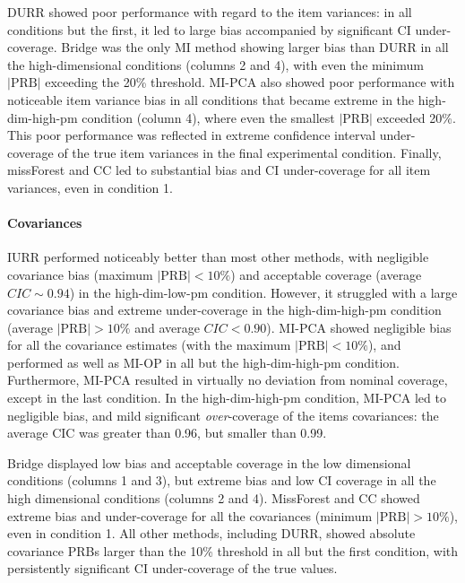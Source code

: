 	DURR showed poor performance with regard to the item variances: in all conditions but the first, it led to 
	large bias accompanied by significant CI under-coverage.
	Bridge was the only MI method showing larger bias than DURR in all the high-dimensional conditions (columns 2 and 4),
	with even the minimum $|\text{PRB}|$ exceeding the 20\% threshold.
	MI-PCA also showed poor performance with noticeable item variance bias in all conditions that became extreme in the
	high-dim-high-pm condition (column 4), where even the smallest $|\text{PRB}|$ exceeded 20\%.
	This poor performance was reflected in extreme confidence interval under-coverage of the true item variances in
	the final experimental condition.
	Finally, missForest and CC led to substantial bias and CI under-coverage for all 
	item variances, even in condition 1.
%
	\paragraph{Covariances}
	IURR performed noticeably better than most other methods, with negligible covariance bias 
	(maximum $|\text{PRB}| < 10\%$) and acceptable coverage (average $CIC \sim 0.94$) in the high-dim-low-pm 
	condition.
	However, it struggled with a large covariance bias and extreme under-coverage in the high-dim-high-pm 
	condition (average $|\text{PRB}| > 10\%$ and average $CIC < 0.90$).
	MI-PCA showed negligible bias for all the covariance estimates (with the maximum $|\text{PRB}| < 10\%$), 
	and performed as well as MI-OP in all but the high-dim-high-pm condition.
	Furthermore, MI-PCA resulted in virtually no deviation from nominal coverage, except in the last condition.
	In the high-dim-high-pm condition, MI-PCA led to negligible bias, and mild significant \emph{over}-coverage 
	of the items covariances: the average CIC was greater than 0.96, but smaller than 0.99.

	Bridge displayed low bias and acceptable coverage in the low dimensional conditions (columns 1 and 3), but 
	extreme bias and low CI coverage in all the high dimensional conditions (columns 2 and 4).
	MissForest and CC showed extreme bias and under-coverage for all the covariances (minimum $|\text{PRB}|>10\%$),
	even in condition 1.
	All other methods, including DURR, showed absolute covariance PRBs larger than the 10\% threshold in all but the 
	first condition, with persistently significant CI under-coverage of the true values.

